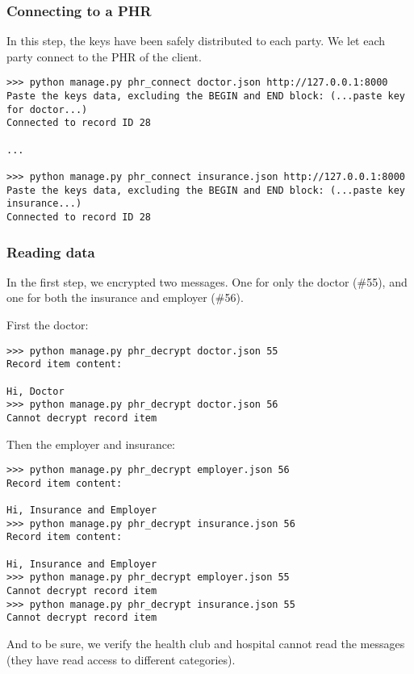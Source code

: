 \documentclass[a4paper]{article}
\begin{document}
		\subsubsection{Connecting to a PHR}\label{sec:usecase_4}
			In this step, the keys have been safely distributed to each party. We let each party connect to the PHR of the client.
		
			\begin{lstlisting}
>>> python manage.py phr_connect doctor.json http://127.0.0.1:8000
Paste the keys data, excluding the BEGIN and END block: (...paste key for doctor...)
Connected to record ID 28

...

>>> python manage.py phr_connect insurance.json http://127.0.0.1:8000
Paste the keys data, excluding the BEGIN and END block: (...paste key insurance...)
Connected to record ID 28
			\end{lstlisting}
			
		\subsubsection{Reading data}\label{sec:usecase_5}
			In the first step, we encrypted two messages. One for only the doctor (\#55), and one for both the insurance and employer (\#56). 
			
			First the doctor:
			
			\begin{lstlisting}
>>> python manage.py phr_decrypt doctor.json 55
Record item content:

Hi, Doctor
>>> python manage.py phr_decrypt doctor.json 56
Cannot decrypt record item
			\end{lstlisting}

			Then the employer and insurance:

			\begin{lstlisting}
>>> python manage.py phr_decrypt employer.json 56
Record item content:

Hi, Insurance and Employer
>>> python manage.py phr_decrypt insurance.json 56
Record item content:

Hi, Insurance and Employer
>>> python manage.py phr_decrypt employer.json 55
Cannot decrypt record item
>>> python manage.py phr_decrypt insurance.json 55
Cannot decrypt record item
			\end{lstlisting}
			
			And to be sure, we verify the health club and hospital cannot read the messages (they have read access to different categories).
\end{document}
